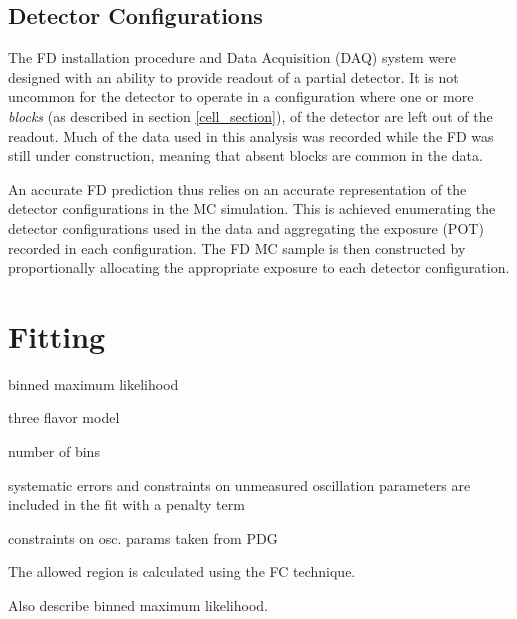 \subsection{Detector Configurations}

The \nova FD installation procedure and Data Acquisition (DAQ) system were
designed with an ability to provide readout of a partial detector.
It is not uncommon for the detector to operate in a configuration where
one or more \textit{blocks} (as described in section \ref{cell_section}),
of the detector are left out of the readout.
Much of the data used in this analysis was recorded while the \nova FD
was still under construction, meaning that absent blocks are common
in the data.

An accurate FD prediction thus relies on an accurate representation
of the detector configurations in the MC simulation.
This is achieved enumerating the detector configurations
used in the data and aggregating the exposure (POT) recorded
in each configuration.
The FD MC sample is then constructed by proportionally allocating
the appropriate exposure to each detector configuration.








\section{Fitting}
\label{fitting_section}

binned maximum likelihood

three flavor model

number of bins

systematic errors and constraints on unmeasured oscillation parameters
are included in the fit with a penalty term

constraints on osc. params taken from PDG

The allowed region is calculated using the FC technique.

Also describe binned maximum likelihood.



